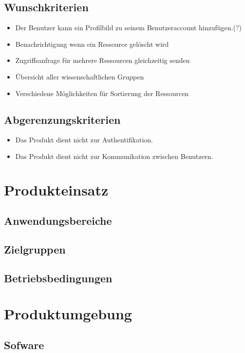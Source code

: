 \documentclass[parskip=full,11pt]{scrartcl}
\begin{document}
\subsection{Wunschkriterien}
\begin{itemize}[itemsep=0pt]
\item Der Benutzer kann ein Profilbild zu seinem Benutzeraccount hinzufügen.(?)
\item Benachrichtigung wenn ein Ressource gelöscht wird
\item Zugriffsanfrage für mehrere Ressourcen gleichzeitig senden
\item Übersicht aller wissenschaftlichen Gruppen
\item Verschiedene Möglichkeiten für Sortierung der Ressourcen
\end{itemize}

\subsection{Abgerenzungskriterien}
\begin{itemize}[itemsep=0pt]
\item Das Produkt dient nicht zur Authentifikation.
\item Das Produkt dient nicht zur Kommunikation zwischen Benutzern.
\end{itemize}


\section{Produkteinsatz}

\subsection{Anwendungsbereiche}
\subsection{Zielgruppen}
\subsection{Betriebsbedingungen}


\section{Produktumgebung}
\subsection{Sofware}
\end{document}
